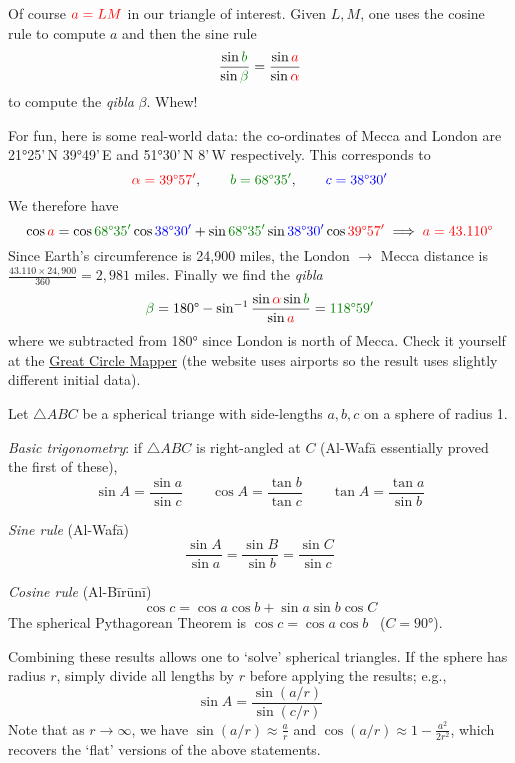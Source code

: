 Of course $\textcolor{red}{a=LM}$ in our triangle of interest. Given $L,M$, one uses the cosine rule to compute $a$ and then the sine rule
\[\frac{\sin \textcolor{Green}{b}}{\sin\textcolor{Green}{\beta}}=\frac{\sin \textcolor{red}{a}}{\sin\textcolor{red}{\alpha}}\]
to compute the \emph{qibla} $\beta$. Whew!\medbreak

For fun, here is some real-world data: the co-ordinates of Mecca and London are \ang{21}25'\,N \ang{39}49'\,E and \ang{51}30'\,N 8'\,W respectively. This corresponds to
\[\textcolor{red}{\alpha=\ang{39}57'},\qquad \textcolor{Green}{b=\ang{68}35'},\qquad \textcolor{blue}{c=\ang{38}30'}\]
We therefore have
\[\cos\textcolor{red}{a}=\cos \textcolor{Green}{\ang{68}35'}\cos \textcolor{blue}{\ang{38}30'}+\sin \textcolor{Green}{\ang{68}35'}\sin\textcolor{blue}{\ang{38}30'}\cos \textcolor{red}{\ang{39}57'} \implies \textcolor{red}{a=\ang{43.110}}\]
Since Earth's circumference is 24,900 miles, the London $\to$ Mecca distance is $\frac{43.110\times 24,900}{360}=2,981$ miles. Finally we find the \emph{qibla}
\[\textcolor{Green}{\beta}=\ang{180} -\sin^{-1}\frac{\sin\textcolor{red}{\alpha}\sin\textcolor{Green}{b}}{\sin \textcolor{red}{a}}=\textcolor{Green}{\ang{118}59'}\]
where we subtracted from \ang{180} since London is north of Mecca. Check it yourself at the \href{http://www.gcmap.com/mapui?P=LON-QCA}{Great Circle Mapper} (the website uses airports so the result uses slightly different initial data).

\goodbreak


Let $\triangle ABC$ be a spherical triange with side-lengths $a,b,c$ on a sphere of radius 1.\smallbreak

\emph{Basic trigonometry}: if $\triangle ABC$ is right-angled at $C$ (Al-Wafā essentially proved the first of these),
\[\sin A=\frac{\sin a}{\sin c}\qquad \cos A=\frac{\tan b}{\tan c}\qquad \tan A=\frac{\tan a}{\sin b}\]

\emph{Sine rule} (Al-Wafā)
\[\frac{\sin A}{\sin a}=\frac{\sin B}{\sin b}=\frac{\sin C}{\sin c}\]

\emph{Cosine rule} (Al-Bīrūnī)
\[\cos c=\cos a\cos b+\sin a\sin b\cos C\]
The spherical Pythagorean Theorem is $\cos c=\cos a\cos b$ \ ($C=\ang{90}$).\smallbreak

Combining these results allows one to `solve' spherical triangles. If the sphere has radius $r$, simply divide all lengths by $r$ before applying the results; e.g.,
\[\sin A=\frac{\sin (a/r)}{\sin(c/r)}\]
Note that as $r\to\infty$, we have $\sin(a/r)\approx \frac ar$ and $\cos(a/r)\approx 1-\frac{a^2}{2r^2}$, which recovers the `flat' versions of the above statements.


